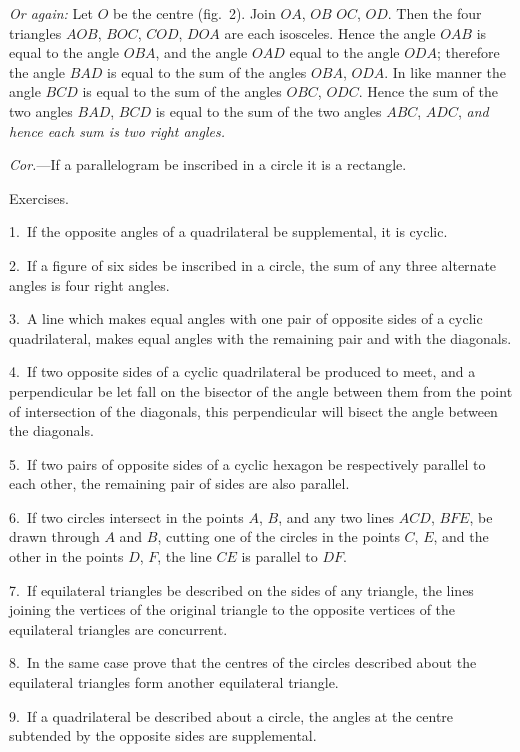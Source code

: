 \documentclass[oneside]{book}
\newcommand\exhead[1]{
\Needspace*{5\baselineskip}\begin{center}
\textsf{#1}
\end{center}
}
\begin{document}
\emph{Or again:} Let $O$ be the centre (fig.~2). Join $OA$, $OB$
$OC$, $OD$. Then the four triangles $AOB$, $BOC$, $COD$,
$DOA$ are each isosceles. Hence the angle $OAB$ is
equal to the angle $OBA$, and the angle $OAD$ equal to
the angle $ODA$; therefore the angle $BAD$ is equal to
the sum of the angles $OBA$, $ODA$. In like manner
the angle $BCD$ is equal to the sum of the angles $OBC$,
$ODC$. Hence the sum of the two angles $BAD$, $BCD$
is equal to the sum of the two angles $ABC$, $ADC$, \emph{and
hence each sum is two right angles.}

\emph{Cor.}---If a parallelogram be inscribed in a circle it is
a rectangle.

\exhead{Exercises.}

\begin{footnotesize}
1.~If the opposite angles of a quadrilateral be supplemental, it
is cyclic.

2.~If a figure of six sides be inscribed in a circle, the sum of
any three alternate angles is four right angles.

3.~A line which makes equal angles with one pair of opposite
sides of a cyclic quadrilateral, makes equal angles with the remaining
pair and with the diagonals.

4.~If two opposite sides of a cyclic quadrilateral be produced to
meet, and a perpendicular be let fall on the bisector of the angle
between them from the point of intersection of the diagonals, this
perpendicular will bisect the angle between the diagonals.

5.~If two pairs of opposite sides of a cyclic hexagon be respectively
parallel to each other, the remaining pair of sides are also
parallel.

6.~If two circles intersect in the points $A$, $B$, and any two lines
$ACD$, $BFE$, be drawn through $A$ and $B$, cutting one of the circles
in the points $C$, $E$, and the other in the points $D$, $F$, the line $CE$
is parallel to $DF$.

7.~If equilateral triangles be described on the sides of any
triangle, the lines joining the vertices of the original triangle
to the opposite vertices of the equilateral triangles are concurrent.

8.~In the same case prove that the centres of the circles described
about the equilateral triangles form another equilateral
triangle.

9.~If a quadrilateral be described about a circle, the angles at
the centre subtended by the opposite sides are supplemental.


\end{footnotesize}
\end{document}
